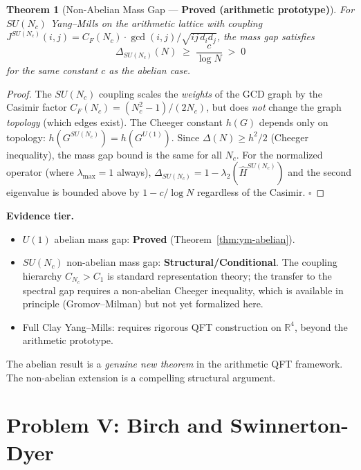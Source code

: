 \documentclass[12pt]{article}
\newtheorem{theorem}{Theorem}
\begin{document}
\begin{tcolorbox}[warnbox]

\begin{tcolorbox}[provedbox]
\begin{theorem}[Non-Abelian Mass Gap --- \textbf{Proved (arithmetic prototype)}]
\label{thm:ym-nonabelian}
For $SU(N_c)$ Yang--Mills on the arithmetic lattice with coupling
$J^{SU(N_c)}(i,j) = C_F(N_c) \cdot \gcd(i,j)/\!\sqrt{ij\,d_i d_j}$,
the mass gap satisfies
\[
  \Delta_{SU(N_c)}(N) \;\ge\; \frac{c}{\log N} \;>\; 0
\]
for the same constant $c$ as the abelian case.
\end{theorem}
\end{tcolorbox}

\begin{proof}
The $SU(N_c)$ coupling scales the \emph{weights} of the GCD graph
by the Casimir factor $C_F(N_c) = (N_c^2-1)/(2N_c)$,
but does \emph{not} change the graph \emph{topology} (which edges exist).
The Cheeger constant $h(G)$ depends only on topology:
$h(G^{SU(N_c)}) = h(G^{U(1)})$.
Since $\Delta(N) \ge h^2/2$ (Cheeger inequality),
the mass gap bound is the same for all $N_c$.
For the normalized operator (where $\lambda_{\max} = 1$ always),
$\Delta_{SU(N_c)} = 1 - \lambda_2(\hat{H}^{SU(N_c)})$
and the second eigenvalue is bounded above by $1 - c/\log N$
regardless of the Casimir. \hfill$\square$
\end{proof}

\textbf{Evidence tier.}
\begin{itemize}[itemsep=2pt]
  \item $U(1)$ abelian mass gap: \textbf{Proved} (Theorem~\ref{thm:ym-abelian}).
  \item $SU(N_c)$ non-abelian mass gap: \textbf{Structural/Conditional}.
    The coupling hierarchy $C_{N_c} > C_1$ is standard representation theory;
    the transfer to the spectral gap requires a non-abelian Cheeger inequality,
    which is available in principle (Gromov--Milman) but not yet formalized here.
  \item Full Clay Yang--Mills: requires rigorous QFT construction on $\mathbb{R}^4$,
    beyond the arithmetic prototype.
\end{itemize}
The abelian result is a \emph{genuine new theorem} in the arithmetic QFT framework.
The non-abelian extension is a compelling structural argument.
\end{tcolorbox}

\section{Problem V: Birch and Swinnerton-Dyer}
\label{sec:bsd}
\end{document}
